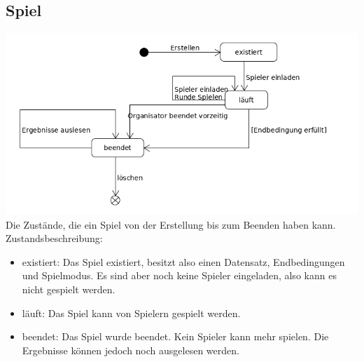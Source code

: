 \documentclass[a4paper]{scrreprt}
\begin{document}
    \subsection{Spiel}
    \label{fig:Spiel_State}
    \includegraphics[width=\textwidth]{uml/export/Spiel_Zustand.png}
    Die Zustände, die ein \Gls{Spiel} von der Erstellung bis zum Beenden haben kann.
    Zustandsbeschreibung:
    \begin{itemize}
    \item existiert: Das \Gls{Spiel} existiert, besitzt also einen Datensatz, Endbedingungen und Spielmodus. Es sind aber noch keine \Gls{Spieler} eingeladen, also kann es nicht gespielt werden.
    \item läuft: Das \Gls{Spiel} kann von \Gls{Spieler}n gespielt werden.
    \item beendet: Das \Gls{Spiel} wurde beendet. Kein \Gls{Spieler} kann mehr spielen. Die Ergebnisse können jedoch noch ausgelesen werden.
    \end{itemize}
\end{document}
